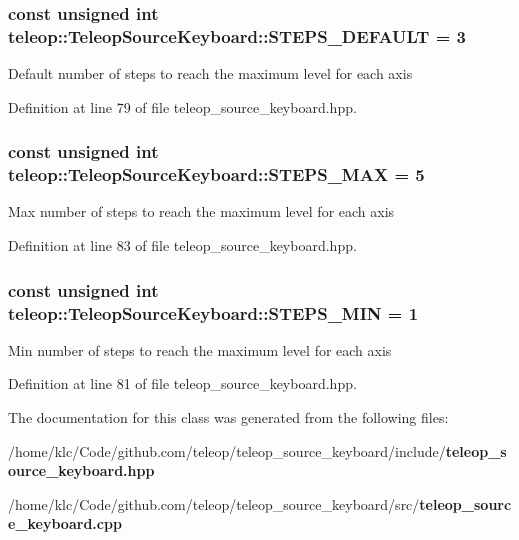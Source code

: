 \subsubsection[{STEPS\_\-DEFAULT}]{\setlength{\rightskip}{0pt plus 5cm}const unsigned int {\bf teleop::TeleopSourceKeyboard::STEPS\_\-DEFAULT} = 3\hspace{0.3cm}{\ttfamily  [static]}}\label{classteleop_1_1TeleopSourceKeyboard_a798dfd6b95ffa7394f4b610e08355fb7}
Default number of steps to reach the maximum level for each axis 

Definition at line 79 of file teleop\_\-source\_\-keyboard.hpp.

\subsubsection[{STEPS\_\-MAX}]{\setlength{\rightskip}{0pt plus 5cm}const unsigned int {\bf teleop::TeleopSourceKeyboard::STEPS\_\-MAX} = 5\hspace{0.3cm}{\ttfamily  [static]}}\label{classteleop_1_1TeleopSourceKeyboard_a82e7603533531b605f3e148d1de7366e}
Max number of steps to reach the maximum level for each axis 

Definition at line 83 of file teleop\_\-source\_\-keyboard.hpp.

\subsubsection[{STEPS\_\-MIN}]{\setlength{\rightskip}{0pt plus 5cm}const unsigned int {\bf teleop::TeleopSourceKeyboard::STEPS\_\-MIN} = 1\hspace{0.3cm}{\ttfamily  [static]}}\label{classteleop_1_1TeleopSourceKeyboard_a13a423ce5ce0d7358f9c6b5d0d820dde}
Min number of steps to reach the maximum level for each axis 

Definition at line 81 of file teleop\_\-source\_\-keyboard.hpp.



The documentation for this class was generated from the following files:\begin{DoxyCompactItemize}
\item 
/home/klc/Code/github.com/teleop/teleop\_\-source\_\-keyboard/include/{\bf teleop\_\-source\_\-keyboard.hpp}\item 
/home/klc/Code/github.com/teleop/teleop\_\-source\_\-keyboard/src/{\bf teleop\_\-source\_\-keyboard.cpp}\end{DoxyCompactItemize}
